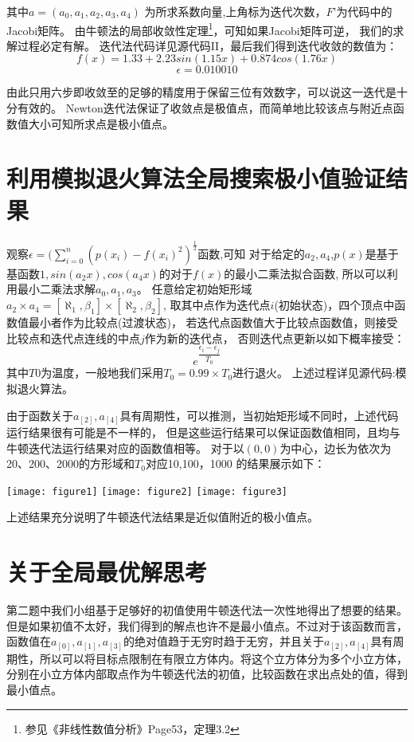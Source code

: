 \documentclass[UTF8]{ctexart}
\begin{document}
其中$a=(a_{0},a_{1},a_{2},a_{3},a_{4})$ 为所求系数向量,上角标为迭代次数，$F’$为代码中的Jacobi矩阵。
由牛顿法的局部收敛性定理\footnote{参见《非线性数值分析》Page53，定理3.2}，可知\quad 如果Jacobi矩阵可逆，
我们的求解过程必定有解。
迭代法代码详见源代码II，最后我们得到迭代收敛的数值为：\\
$$f(x)=1.33+2.23sin(1.15x)+0.874cos(1.76x)$$
$$\epsilon=0.010010$$

由此只用六步即收敛至的足够的精度用于保留三位有效数字，可以说这一迭代是十分有效的。
Newton迭代法保证了收敛点是极值点，而简单地比较该点与附近点函数值大小可知所求点是极小值点。

\section{利用模拟退火算法全局搜索极小值验证结果}
观察$\epsilon=(\sum_{i=0}^{n}(p(x_{i})-f(x_i)^{2})^\frac{1}{2}$函数,可知
对于给定的$a_{2},a_{4}$,$p(x)$是基于基函数$1,sin(a_{2}x),cos(a_{4}x)$的对于$f(x)$的最小二乘法拟合函数,
所以可以利用最小二乘法求解$a_{0},a_{1},a_{3}$。
任意给定初始矩形域$a_{2}\times a_{4}=[\aleph_{1},\beta_{1}]\times[\aleph_{2},\beta_{2}]$,
取其中点作为迭代点$i$(初始状态)，四个顶点中函数值最小者作为比较点(过渡状态)，
若迭代点函数值大于比较点函数值，则接受比较点和迭代点连线的中点$j$作为新的迭代点，
否则迭代点更新以如下概率接受：
$$e^{\dfrac{\epsilon_{i}-\epsilon_{j}}{T_{0}}}$$
其中$T0$为温度，一般地我们采用$T_{0}=0.99\times T_{0}$进行退火。
上述过程详见源代码:模拟退火算法。

由于函数关于$a_[2],a_[4]$具有周期性，可以推测，当初始矩形域不同时，上述代码运行结果很有可能是不一样的，
但是这些运行结果可以保证函数值相同，且均与牛顿迭代法运行结果对应的函数值相等。
对于以$(0,0)$为中心，边长为依次为20、200、2000的方形域和$T_{0}$对应10,100，1000 的结果展示如下：
\begin{figure*}[h!]
	\centering
	\texttt{[image: figure1]}
	\texttt{[image: figure2]}
	\texttt{[image: figure3]}
\end{figure*}

上述结果充分说明了牛顿迭代法结果是近似值附近的极小值点。

\section{关于全局最优解思考}
第二题中我们小组基于足够好的初值使用牛顿迭代法一次性地得出了想要的结果。但是如果初值不太好，我们得到的解点也许不是最小值点。不过对于该函数而言，函数值在$a_[0],a_[1],a_[3]$的绝对值趋于无穷时趋于无穷，并且关于$a_[2],a_[4]$具有周期性，所以可以将目标点限制在有限立方体内。将这个立方体分为多个小立方体，分别在小立方体内部取点作为牛顿迭代法的初值，比较函数在求出点处的值，得到最小值点。
\end{document}
